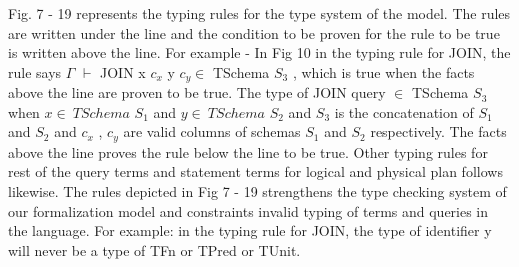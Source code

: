 Fig. 7 - 19 represents the typing rules for the type system of the model. The rules are written under the line and the condition to be proven for the rule to be true is written above the line. For example - In Fig 10 in the typing rule for JOIN, the rule says \newline $\Gamma$ $\vdash$ JOIN \:x \:$c_x$ \:y \:$c_y \in$ TSchema \:$S_3$ ,\: which is true when the facts above the line are proven to be true. The type of JOIN query $\in$ TSchema \:$S_3$ when $x \in \: TSchema$ \:$S_1$ and $y \in \: TSchema$ \:$S_2$ and $S_3$ is the concatenation of $S_1$ and $S_2$ and $c_x$ , $c_y$ are valid columns of schemas $S_1$ and $S_2$ respectively. The facts above the line proves the rule below the line to be true. Other typing rules for rest of the query terms and statement terms for logical and physical plan follows likewise.
The rules depicted in Fig 7 - 19 strengthens the type checking system of our formalization model and constraints invalid typing of terms and queries in the language. For example: in the typing rule for JOIN, the type of identifier y will never be a type of TFn or TPred or TUnit.  
